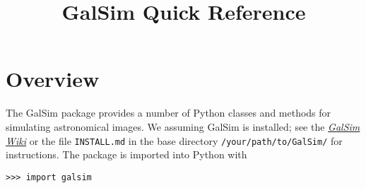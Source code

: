 \documentclass[preprint,11pt]{aastex}
\begin{document}
\setlength{\parskip}{2.0ex plus 0.5ex minus 0.5ex}
\setlength{\parindent}{0cm} 

\title{GalSim Quick Reference}

\tableofcontents

\newpage

\section{Overview}


The GalSim package provides a number of Python classes and methods for
simulating astronomical images.  We assuming GalSim is installed; see the
\href{https://github.com/GalSim-developers/GalSim/wiki}{\emph{GalSim
    Wiki}} or the file \texttt{INSTALL.md} in the base directory \texttt{/your/path/to/GalSim/}
for instructions.  The package is imported into Python with

\texttt{>>> import galsim}
\end{document}
